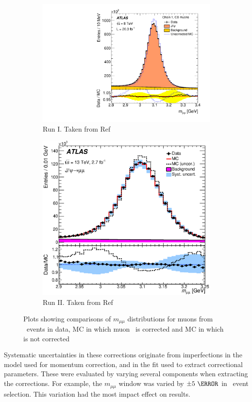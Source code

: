 \begin{figure}[!h]
\begin{subfigure}{0.5\textwidth}
   \includegraphics[width=\textwidth]{figures/STACO_jpsi_cb12.pdf}
	\caption{Run I. Taken from Ref~\cite{Aad:2014rra}}
\end{subfigure} %
\begin{subfigure}{0.5\textwidth}
   \includegraphics[width=\textwidth]{figures/fig_09_2.eps}
	\caption{Run II. Taken from Ref~\cite{Aad:2016jkr}}
\end{subfigure}
	\caption{Plots showing comparisons of $m_{\mu\mu}$ distributions for muons from \Jmm\ events in data, MC in 
which muon \pT\ is corrected and MC in which \pT is not corrected}
\label{fig:muScale}
\end{figure}

\par Systematic uncertainties in these corrections originate from imperfections in the model 
used for momentum correction, and in the fit used to extract correctional parameters. 
These were evaluated by varying several components when extracting the corrections. For example, the 
$m_{\mu\mu}$ window was varied by $\pm 5~\GeV$ in \Zmm\ event selection. This variation had the most impact 
effect on results.   

